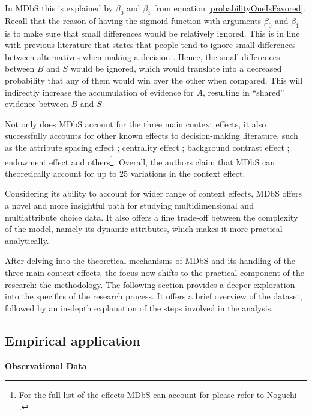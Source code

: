 \documentclass[a4paper,12pt]{article}
\newcommand{\citeyearonly}[1]{\citeyearpar{#1}}
\begin{document}
In MDbS this is explained by $\beta_0$ and $\beta_1$ from equation \ref{probabilityOneIsFavored}. Recall that the reason of having the sigmoid function with arguments $\beta_0$ and $\beta_1$ is to make sure that small differences would be relatively ignored. This is in line with previous literature that states that people tend to ignore small differences between alternatives when making a decision \citep{kalwani1992consumer}. Hence, the small differences between $B$ and $S$ would be ignored, which would translate into a decreased probability that any of them would win over the other when compared. This will indirectly increase the accumulation of evidence for $A$, resulting in ``shared'' evidence between $B$ and $S$.

Not only does MDbS account for the three main context effects, it also successfully accounts for other known effects to decision-making literature, such as the attribute spacing effect \citep{cooke1998multiattribute}; centrality effect \citep{brown2011decision}; background contrast effect \citep{tverskySimonson93}; endowment effect \citep{knetsch1989endowment} and others\footnote{For the full list of the effects MDbS can account for please refer to Noguchi \citeyearonly{noguchi2018multialternative}.}. Overall, the authors claim that MDbS can theoretically account for up to 25 variations in the context effect. 

Considering its ability to account for wider range of context effects, MDbS offers a novel and more insightful path for studying multidimensional and multiattribute choice data. It also offers a fine trade-off between the complexity of the model, namely its dynamic attributes, which makes it more practical analytically. 

After delving into the theoretical mechanisms of MDbS and its handling of the three main context effects, the focus now shifts to the practical component of the research: the methodology. The following section provides a deeper exploration into the specifics of the research process. It offers a brief overview of the dataset, followed by an in-depth explanation of the steps involved in the analysis.

\subsection{Empirical application}

\textbf{Observational Data}\label{section:observationalDataDescription}
\end{document}
